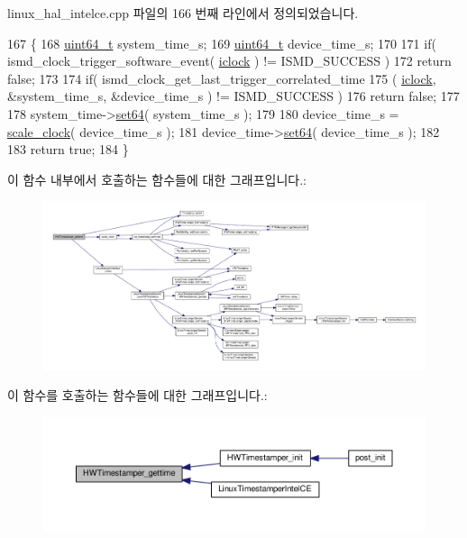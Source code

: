 linux\+\_\+hal\+\_\+intelce.\+cpp 파일의 166 번째 라인에서 정의되었습니다.


\begin{DoxyCode}
167                                  \{
168     \hyperlink{parse_8c_aec6fcb673ff035718c238c8c9d544c47}{uint64\_t} system\_time\_s;
169     \hyperlink{parse_8c_aec6fcb673ff035718c238c8c9d544c47}{uint64\_t} device\_time\_s;
170 
171     \textcolor{keywordflow}{if}( ismd\_clock\_trigger\_software\_event( \hyperlink{class_linux_timestamper_intel_c_e_a5a43b6dbee61e4ed5c9bae96f5d24830}{iclock} ) != ISMD\_SUCCESS )
172         \textcolor{keywordflow}{return} \textcolor{keyword}{false};
173 
174     \textcolor{keywordflow}{if}( ismd\_clock\_get\_last\_trigger\_correlated\_time
175         ( \hyperlink{class_linux_timestamper_intel_c_e_a5a43b6dbee61e4ed5c9bae96f5d24830}{iclock}, &system\_time\_s, &device\_time\_s ) != ISMD\_SUCCESS )
176         \textcolor{keywordflow}{return} \textcolor{keyword}{false};
177 
178     system\_time->\hyperlink{class_timestamp_aa62b073d8565fc6536122e8c27351f5c}{set64}( system\_time\_s );
179 
180     device\_time\_s = \hyperlink{linux__hal__intelce_8cpp_aedd001ba04a531b4f23af1c9bd845382}{scale\_clock}( device\_time\_s );
181     device\_time->\hyperlink{class_timestamp_aa62b073d8565fc6536122e8c27351f5c}{set64}( device\_time\_s );
182 
183     \textcolor{keywordflow}{return} \textcolor{keyword}{true};
184 \}
\end{DoxyCode}


이 함수 내부에서 호출하는 함수들에 대한 그래프입니다.\+:
\nopagebreak
\begin{figure}[H]
\begin{center}
\leavevmode
\includegraphics[width=350pt]{class_linux_timestamper_intel_c_e_a8db9570fc51b914ef4630a79a4947821_cgraph}
\end{center}
\end{figure}




이 함수를 호출하는 함수들에 대한 그래프입니다.\+:
\nopagebreak
\begin{figure}[H]
\begin{center}
\leavevmode
\includegraphics[width=350pt]{class_linux_timestamper_intel_c_e_a8db9570fc51b914ef4630a79a4947821_icgraph}
\end{center}
\end{figure}


